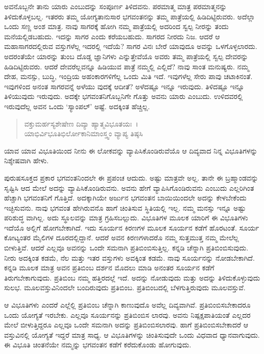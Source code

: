 ಅವನೊಬ್ಬನೇ ತಾನು ಯಾರು ಎಂಬುದನ್ನು ಸಂಪೂರ್ಣ ತಿಳಿದವನು. ಪರಮಾತ್ಮ ಮಾತ್ರ ಪರಮಾತ್ಮನನ್ನು ತಿಳಿದುಕೊಳ್ಳಬಲ್ಲ. ಇತರರು ತಮ್ಮ ಯೋಗ್ಯತಾನುಸಾರ ಭಗವಂತನನ್ನು ತಮ್ಮ ಪಾತ್ರೆಯಲ್ಲಿ ಹಿಡಿದಿಟ್ಟಿರುವರು. ಅದೆಲ್ಲಾ ಒಂದು ಸಣ್ಣ ಅಂಶ ಮಾತ್ರ. ನಾವು ಸಾಗರಕ್ಕೆ ಹೋಗಿ ನಮ್ಮ ಪಾತ್ರೆಯಲ್ಲಿ ಅದರಿಂದ ಸ್ವಲ್ಪ ನೀರನ್ನು ತಂದು ಮನೆಯಲ್ಲಿಡಬಹುದು. ಇದನ್ನು ಸಾಗರ ಎಂದು ಕರೆಯಬಹುದು. ಸಾಗರದ ನೀರದು ನಿಜ. ಆದರೆ ಆ ಮಹಾಸಾಗರದಲ್ಲಿರುವ ವಸ್ತುಗಳೆಲ್ಲ ಇದರಲ್ಲಿ ಇದೆಯೆ? ಸಾಗರ ವಿನಃ ಬೇರೆ ಯಾವುದೂ ಅವನ್ನು ಒಳಗೊಳ್ಳಲಾರದು. ಅದರಂತೆಯೇ ಯಾರನ್ನು ತುಂಬ ದೊಡ್ಡ ಜ್ಞಾನಿಗಳು ಎನ್ನುತ್ತೇವೆಯೊ ಅವರು ತಮ್ಮ ಪಾತ್ರೆಯಲ್ಲಿ ಸ್ವಲ್ಪ ದೇವರನ್ನು ಹಿಡಿದಿಟ್ಟಿರುವರು. ಆದರೆ ದೇವರೆಲ್ಲವನ್ನೂ ಹಿಡಿಯುವ ಪಾತ್ರೆ ನಮ್ಮಲ್ಲಿ ಎಲ್ಲಿದೆ? ನಾವು ಸಾಂತ ಮನುಷ್ಯರು. ನಮ್ಮ ದೇಹ, ಮನಸ್ಸು, ಬುದ್ಧಿ, ಇಂದ್ರಿಯ ಅಹಂಕಾರಗಳಿಗೆಲ್ಲ ಒಂದು ಮಿತಿ ಇದೆ. ಇವುಗಳೆಲ್ಲ ಸೇರು ಪಾವು ಚಟಾಕಿನಂತೆ. ಇವುಗಳಿಂದ ಅನಂತ ಸಾಗರವನ್ನೆ ಅಳೆಯು ವುದಕ್ಕೆ ಆದೀತೆ? ಅಳೆದಷ್ಟೂ ಇನ್ನೂ ಇರುವುದು. ತಿಳಿದಷ್ಟೂ ಇನ್ನೂ ತಿಳಿಯುವುದು ಇರುವುದು. ಅದಕ್ಕೇ ಭಗವಂತನಿಗೊಬ್ಬನಿಗೇ ಗೊತ್ತು ಅವನು ಯಾರು ಎಂಬುದು. ಉಳಿದವರಲ್ಲಿ ಇರುವುದೆಲ್ಲ ಅವನ ಒಂದು ‘ಸ್ಯಾಂಪಲ್​’ ಅಷ್ಟೆ. ಅದಕ್ಕಿಂತ ಹೆಚ್ಚಿಲ್ಲ.

\begin{verse}
ವಕ್ತುಮರ್ಹಸ್ಯಶೇಷೇಣ ದಿವ್ಯಾ ಹ್ಯಾತ್ಮವಿಭೂತಯಃ~।\\ಯಾಭಿರ್ವಿಭೂತಿಭಿರ್ಲೋಕಾನಿಮಾಂಸ್ತ್ವಂ ವ್ಯಾಪ್ಯ ತಿಷ್ಠಸಿ 
\end{verse}

{\small ಯಾವ ಯಾವ ವಿಭೂತಿಯಿಂದ ನೀನು ಈ ಲೋಕವನ್ನು ವ್ಯಾಪಿಸಿಕೊಂಡಿರುವೆಯೊ ಆ ದಿವ್ಯವಾದ ನಿನ್ನ ವಿಭೂತಿಗಳನ್ನು ನಿಶ್ಶೇಷವಾಗಿ ಹೇಳು.}

ಪುರುಷಸೂಕ್ತದ ಪ್ರಕಾರ ಭಗವಂತನಿಂದಲೇ ಈ ಪ್ರಪಂಚ ಆದುದು. ಅಷ್ಟು ಮಾತ್ರವೇ ಅಲ್ಲ. ತಾನೇ ಈ ಬ್ರಹ್ಮಾಂಡವನ್ನು ಸೃಷ್ಟಿಸಿ ಆದ ಮೇಲೆ ಅದನ್ನು ವ್ಯಾಪಿಸಿಕೊಂಡಿರುವನು. ಅವನು ಹೇಗೆ ವ್ಯಾಪಿಸಿಗೊಂಡಿರುವನು ಎಂಬುದು ಎಲ್ಲರಿಗಿಂತ ಹೆಚ್ಚಾಗಿ ಭಗವಂತನಿಗೆ ಗೊತ್ತಿದೆ. ಅದಕ್ಕಾಗಿಯೇ ಅರ್ಜುನ ಭಗವಂತನ ಬಾಯಿಯಿಂದಲೇ ಅದನ್ನು ಕೇಳಬೇಕೆಂದು ಇಚ್ಛಿಸುವನು. ನಾವು ಭಗವಂತ ಹೇಗಿರುವನೊ ಹಾಗೆ ಚಿಂತಿಸುವ ಸ್ಥಿತಿಯಲ್ಲಿ ಇಲ್ಲ. ನಮ್ಮ ಮನಸ್ಸು ಇನ್ನೂ ಅಷ್ಟು ಪರಿಶುದ್ಧ ವಾಗಿಲ್ಲ. ಅದು ಸ್ಥೂಲವನ್ನು ಮಾತ್ರ ಗ್ರಹಿಸಬಲ್ಲುದು. ವಿಭೂತಿಗಳ ಮೂಲಕ ಯಾರಿಗೆ ಈ ವಿಭೂತಿಗಳು ಇದೆಯೊ ಅಲ್ಲಿಗೆ ಹೋಗಬೇಕಾಗಿದೆ. ಇದು ಸೂರ್ಯನ ಕಿರಣಗಳ ಮೂಲಕ ಸೂರ್ಯನ ಕಡೆಗೆ ಹೊರಟಂತೆ. ಸೂರ್ಯ ಕೋಟ್ಯಂತರ ಮೈಲಿಗಳ ದೂರದಲ್ಲಿದ್ದಾನೆ. ಆದರೆ ಅವನ ಕಿರಣಗಳಾದರೊ ನಮ್ಮ ಸುತ್ತಮುತ್ತ ನಮ್ಮ ಮೇಲೆಲ್ಲ ಬೀಳುತ್ತಿವೆ. ಆದರೆ ಎಲ್ಲವೂ ಅವನನ್ನು ಒಂದೇ ಸಮನಾಗಿ ಪ್ರತಿಬಿಂಬಿಸುತ್ತಿಲ್ಲ. ಕನ್ನಡಿ ಚೆನ್ನಾಗಿ ಪ್ರತಿಬಿಂಬಿಸುವುದು. ನೀರು ಅದಕ್ಕಿಂತ ಕಡಮೆ, ನೆಲ ಮತ್ತು ಇತರ ವಸ್ತುಗಳು ಅವಕ್ಕಿಂತ ಕಡಮೆ. ನಾವು ಸೂರ್ಯನನ್ನು ನೋಡಬೇಕಾಗಿದೆ. ಕನ್ನಡಿ ಮೂಲಕ ಮಾತ್ರ ಅವನ ಪ್ರತಿಬಿಂಬ ದರ್ಶನ ಮೊದಲು ಮಾಡಿ ಅನಂತರ ಸೂರ್ಯನ ಕಡೆಗೆ ತಿರುಗಬೇಕಾಗುವುದು. ಪ್ರತಿಬಿಂಬ ನಮ್ಮ ಹತ್ತಿರದಲ್ಲೆ ಇದೆ. ಅದನ್ನು ನೋಡುವುದು ಮತ್ತು ಅದನ್ನು ತಿಳಿದುಕೊಳ್ಳುವುದು ಸುಲಭ. ಮೂಲವಸ್ತುವಿನಿಂದಲೇ ಬಂದಿರುವುದು ಪ್ರತಿಬಿಂಬ. ಪ್ರತಿಬಿಂಬದಲ್ಲಿ ಬೆಳಗುತ್ತಿರುವುದು ಮೂಲವಸ್ತುವೆ.

ಆ ವಿಭೂತಿಗಳು ಎಂದರೆ ಎಲ್ಲೆಲ್ಲಿ ಪ್ರತಿಬಿಂಬ ಚೆನ್ನಾಗಿ ಕಾಣುವುದೊ ಅವೆಲ್ಲ ದಿವ್ಯವಾಗಿವೆ. ಪ್ರತಿಬಿಂಬಿಸಬೇಕಾದರೂ ಒಂದು ಯೋಗ್ಯತೆ ಇರಬೇಕು. ಎಲ್ಲವೂ ಸೂರ್ಯನನ್ನು ಪ್ರತಿಬಿಂಬಿಸ ಲಾರವು. ಅವನು ನಿಷ್ಪಕ್ಷಪಾತಿಯಂತೆ ಎಲ್ಲದರ ಮೇಲೆ ಬೀಳುತ್ತಿದ್ದರೂ ಎಲ್ಲವೂ ಒಂದೇ ಸಮನಾಗಿ ಅದನ್ನು ಪ್ರತಿಬಿಂಬಿಸಲಾರವು. ಹಾಗೆ ಪ್ರತಿಬಿಂಬಿಸಬೇಕಾದರೆ ಆ ವಸ್ತುವಿನಲ್ಲಿ ಯೋಗ್ಯತೆ ಇದ್ದರೆ ಮಾತ್ರ ಸಾಧ್ಯ. ಆ ವಿಭೂತಿಗಳನ್ನು ಚಿಂತಿಸುವುದೇ ಒಂದು ವಿಧವಾದ ಧ್ಯಾನವಾಗುವುದು. ಈ ವಿಭೂತಿ ಚಿಂತನೆಯೇ ನಮ್ಮನ್ನು ಭಗವಂತನ ಕಡೆಗೆ ಕರೆದುಕೊಂಡು ಹೋಗುವುದು.

